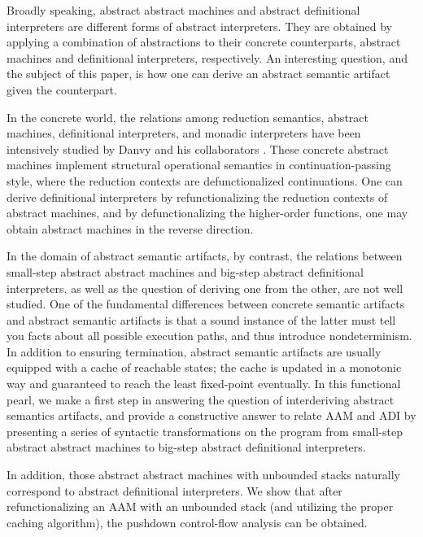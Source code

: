 \documentclass[acmsmall, review]{acmart}\settopmatter{}
\begin{document}
Broadly speaking, abstract abstract machines and abstract definitional interpreters are
different forms of abstract interpreters. They are obtained by applying a combination
of abstractions to their concrete counterparts, abstract machines and definitional
interpreters, respectively. An interesting question, and the subject of this paper, is
how one can derive an abstract semantic artifact given the counterpart.

In the concrete world, the relations among reduction semantics, abstract machines,
definitional interpreters, and monadic interpreters have been intensively studied by
Danvy and his collaborators \cite{Ager:2003:FCE:888251.888254, Danvy:2001:DW:773184.773202,
danvy2004refocusing, Danvy:2008:DIP:1411204.1411206, AGER2004223, ager2005functional,
Danvy:2006:RW:2171265.2171268, danvy2009towards, biernacka2009towards}.
These concrete abstract machines implement structural operational semantics in 
continuation-passing style, where the reduction contexts are defunctionalized continuations.
One can derive definitional interpreters by refunctionalizing the reduction contexts of
abstract machines, and by defunctionalizing the higher-order functions, one may obtain
abstract machines in the reverse direction.

In the domain of abstract semantic artifacts, by contrast, the relations between small-step
abstract abstract machines and big-step abstract definitional interpreters, as well as the
question of deriving one from the other, are not well studied.
One of the fundamental differences between concrete semantic artifacts and abstract semantic
artifacts is that a sound instance of the latter must tell you facts about all possible execution paths, and
thus introduce nondeterminism. In addition to ensuring termination, abstract semantic
artifacts are usually equipped with a cache of reachable states; the cache is
updated in a monotonic way and guaranteed to reach the least fixed-point eventually.
In this functional pearl, we make a first step in answering the question of interderiving
abstract semantics artifacts, and provide a constructive answer to relate AAM and ADI
by presenting a series of syntactic transformations on the program from small-step
abstract abstract machines to big-step abstract definitional interpreters.

In addition, those abstract abstract machines with unbounded stacks naturally correspond
to abstract definitional interpreters. We show that after refunctionalizing an AAM with an
unbounded stack (and utilizing the proper caching algorithm), the pushdown control-flow analysis
can be obtained.
\end{document}
